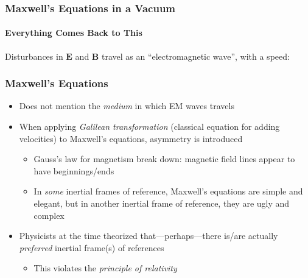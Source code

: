 \documentclass[12pt,compress,aspectratio=169]{beamer}
\newcommand{\mb}[1]{\mathbf{#1}}
\begin{document}
\begin{frame}
  \frametitle{Maxwell's Equations in a Vacuum}
  \framesubtitle{Everything Comes Back to This}

  \vspace{-.3in}{\Large
    \begin{align*}
      \nabla\cdot\mb{E} &= 0\\
      \nabla\cdot\mb{B} &= 0\\
      \nabla\times\mb{E} &=-\frac{\partial\mb{B}}{\partial t}\\
      \nabla\times\mb{B} &=\mu_0\varepsilon_0\frac{\partial\mb{E}}{\partial t}
    \end{align*}
  }
  
  \vspace{-.15in}Disturbances in $\mb{E}$ and $\mb{B}$ travel as an
  ``electromagnetic wave'', with a speed:

\end{frame}


\begin{frame}
  \frametitle{Maxwell's Equations}
  \begin{itemize}
  \item Does not mention the \emph{medium} in which EM waves travels
  \item When applying \emph{Galilean transformation} (classical equation for
    adding velocities) to Maxwell's equations, asymmetry is introduced
    \begin{itemize}
    \item Gauss's law for magnetism break down: magnetic field lines appear to
      have beginnings/ends
    \item In \emph{some} inertial frames of reference,
      Maxwell's equations are simple and elegant, but in another inertial frame
      of reference, they are ugly and complex
    \end{itemize}
  \item Physicists at the time theorized that---perhaps---there is/are actually
    \emph{preferred} inertial frame(s) of references
    \begin{itemize}
    \item This violates the \emph{principle of relativity}
    \end{itemize}
  \end{itemize}
\end{frame}
\end{document}
